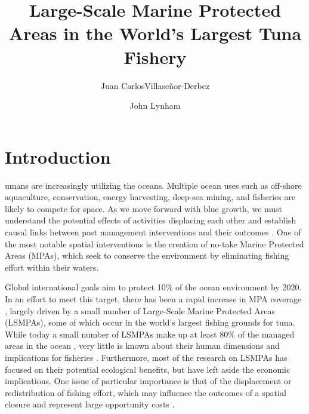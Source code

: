 \documentclass[9p,twocolumn,twoside,lineno]{pnas-new}
\title{Large-Scale Marine Protected Areas in the World's Largest Tuna Fishery}
\author[a,1]{Juan CarlosVillase\~{n}or-Derbez}
\author[b]{John Lynham}
\affil[a]{Bren School of Environmental Science \& Management, University of California at Santa Barbara, Santa Barbara, CA}
\affil[b]{Department of Economics, University of Hawaii at Manoa, Honolulu, HI}
\begin{document}
\maketitle
\thispagestyle{firststyle}


\section{Introduction}\label{introduction}

umans are increasingly utilizing the oceans. Multiple ocean uses such as off-shore aquaculture, conservation, energy harvesting, deep-sea mining, and fisheries are likely to compete for space. As we move forward with blue growth, we must understand the potential effects of activities displacing each other and establish causal links between past management interventions and their outcomes \citep{burgess_2018}. One of the most notable spatial interventions is the creation of no-take Marine Protected Areas (MPAs), which seek to conserve the environment by eliminating fishing effort within their waters.

Global international goals aim to protect 10\% of the ocean environment by 2020. In an effort to meet this target, there has been a rapid increase in MPA coverage \citep{wood_2008,sala_2018}, largely driven by a small number of Large-Scale Marine Protected Areas (LSMPAs), some of which occur in the world's largest fishing grounds for tuna. While today a small number of LSMPAs make up at least 80\% of the managed areas in the ocean \citep{toonen_2013}, very little is known about their human dimensions and implications for fisheries \citep{gray_2017}. Furthermore, most of the research on LSMPAs has focused on their potential ecological benefits, but have left aside the economic implications. One issue of particular importance is that of the displacement or redistribution of fishing effort, which may influence the outcomes of a spatial closure and represent large opportunity costs \citep{smith_2003,smith_2010}.
\end{document}
